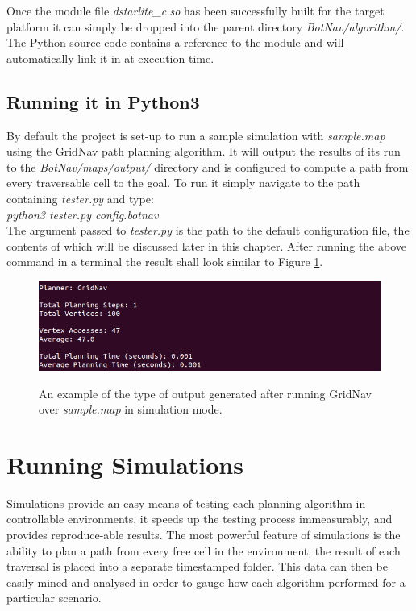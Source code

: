 \noindent
Once the module file \textit{dstarlite\_c.so} has been successfully built for the target platform it can simply be dropped into the parent directory \textit{BotNav/algorithm/}. The Python source code contains a reference to the module and will automatically link it in at execution time. 

\subsection{Running it in Python3}
\noindent
By default the project is set-up to run a sample simulation with \textit{sample.map} using the GridNav path planning algorithm. It will output the results of its run to the \textit{BotNav/maps/output/} directory and is configured to compute a path from every traversable cell to the goal. To run it simply navigate to the path containing \textit{tester.py} and type: \\

\indent \textit{python3 tester.py config.botnav} \\

\noindent
The argument passed to \textit{tester.py} is the path to the default configuration file, the contents of which will be discussed later in this chapter. After running the above command in a terminal the result shall look similar to Figure \ref{sample_output}.

\begin{figure}[htbp]

\center \includegraphics[width=435pt]{illustrations/sample_output}\\
\caption{An example of the type of output generated after running GridNav over \textit{sample.map} in simulation mode.} 
\label{sample_output}

\end{figure}


\section{Running Simulations}
\noindent
Simulations provide an easy means of testing each planning algorithm in controllable environments, it speeds up the testing process immeasurably, and provides reproduce-able results. The most powerful feature of simulations is the ability to plan a path from every free cell in the environment, the result of each traversal is placed into a separate timestamped folder. This data can then be easily mined and analysed in order to gauge how each algorithm performed for a particular scenario.

